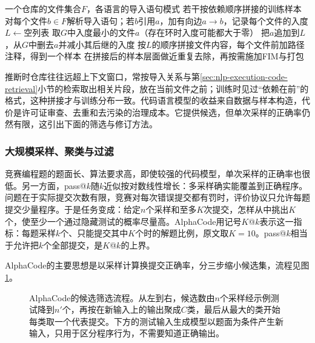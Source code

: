 \begin{algorithm}[仓库级预训练样本的依赖排序]
  \label{alg:nlp-execution-repo-order}
  \begin{algorithmic}[1]
    \Require 一个仓库的文件集合$F$，各语言的导入语句模式
    \Ensure 若干按依赖顺序拼接的训练样本
    \State 对每个文件$b\in F$解析导入语句；若$b$引用$a$，加有向边$a\to b$，记录每个文件的入度
      \State $L\gets$空列表
        \State 取$G$中入度最小的文件$a$（存在环时入度可能都大于零）
        \State 把$a$追加到$L$，从$G$中删去$a$并减小其后继的入度
      \EndWhile
      \State 按$L$的顺序拼接文件内容，每个文件前加路径注释，得到一个样本
    \EndFor
    \State 在拼接后的样本层面做近重复去除，再按需施加FIM与打包
  \end{algorithmic}
\end{algorithm}

推断时仓库往往远超上下文窗口，常按导入关系与第\ref{sec:nlp-execution-code-retrieval}小节的检索取出相关片段，放在当前文件之前；训练时见过“依赖在前”的格式，这种拼接才与训练分布一致。代码语言模型的收益来自数据与样本构造，代价是许可证审查、去重和去污染的治理成本。它提供候选，但单次采样的正确率仍然有限，这引出下面的筛选与修订方法。

\subsubsection{大规模采样、聚类与过滤}
\label{sec:nlp-execution-alphacode}

竞赛编程题的题面长、算法要求高，即使较强的代码模型，单次采样的正确率也很低。另一方面，pass@$k$随$k$近似按对数线性增长：多采样确实能覆盖到正确程序。问题在于实际提交次数有限，竞赛对每次错误提交都有罚时，评价协议只允许每题提交少量程序。于是任务变成：给定$n$个采样和至多$K$次提交，怎样从中挑出$K$个，使至少一个通过隐藏测试的概率尽量高。AlphaCode用记号$K$@$k$表示这一指标\cite{nlp-execution-li2022alphacode}：每题采样$k$个、只能提交其中$K$个时的解题比例，原文取$K=10$。pass@$k$相当于允许把$k$个全部提交，是$K$@$k$的上界。

AlphaCode的主要思想是以采样计算换提交正确率，分三步缩小候选集，流程见图\ref{fig:nlp-execution-alphacode}。

\begin{figure}[htbp]
  \centering
  
  \caption{AlphaCode的候选筛选流程。从左到右，候选数由$n$个采样经示例测试降到$n'$个，再按在新输入上的输出聚成$C$类，最后从最大的类开始每类取一个代表提交。下方的测试输入生成模型以题面为条件产生新输入，只用于区分程序行为，不需要知道正确输出。}
  \label{fig:nlp-execution-alphacode}
\end{figure}

